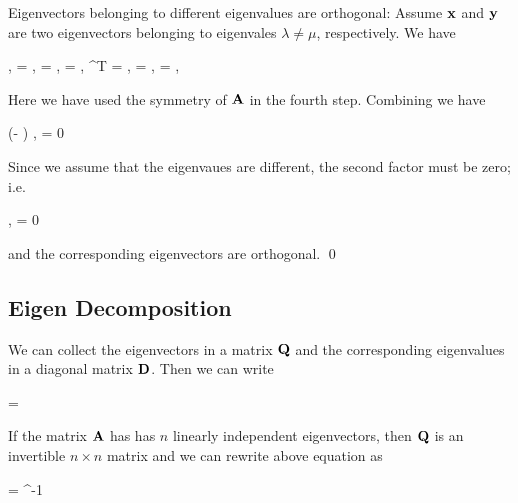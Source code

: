 Eigenvectors belonging to different eigenvalues are orthogonal: Assume $\mathbf{x}$ and $\mathbf{y}$ are two eigenvectors belonging to eigenvales $\lambda \neq \mu$, respectively. We have

\bee
\lambda \langle \xbf, \ybf \rangle = \langle \lambda \xbf, \ybf \rangle = \langle \Abf \xbf, \ybf \rangle = \langle \xbf , \Abf^T \ybf \rangle = \langle\xbf, \Abf\ybf\rangle = \langle\xbf, \mu \ybf\rangle = \mu \langle\xbf, \ybf\rangle
\eee

Here we have used the symmetry of $\mathbf{A}$ in the fourth step. Combining we have

\bee
(\lambda - \mu) \langle\xbf, \ybf \rangle = 0
\eee

Since we assume that the eigenvaues are different, the second factor must be zero; i.e.

\bee
\langle\xbf, \ybf\rangle = 0
\eee

and the corresponding eigenvectors are orthogonal. \qed


\subsection{Eigen Decomposition}

We can collect the eigenvectors in a matrix $\mathbf{Q}$ and the corresponding eigenvalues in a diagonal matrix $\mathbf{D}$. Then we can write

\bee
\Abf \Qbf = \Dbf \Qbf
\eee

If the matrix $\mathbf{A}$ has has $n$ linearly independent eigenvectors, then $\mathbf{Q}$ is an invertible $n \times n$ matrix and we can rewrite above equation as

\bee
\Abf = \Qbf \Dbf \Qbf^{-1}
\eee





